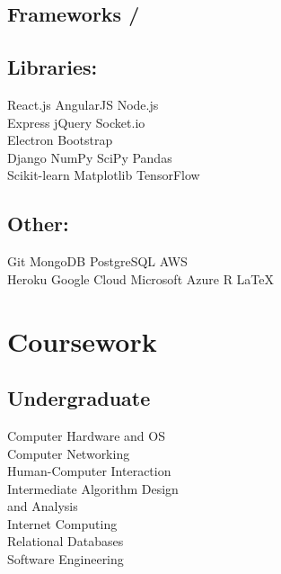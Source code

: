 \documentclass[]{deedy-resume-openfont}
\begin{document}
\begin{minipage}[t]{0.3\textwidth}
\subsection{Frameworks /}
\subsection{Libraries:}
\vspace{1mm}
React.js \textbullet{} AngularJS \textbullet{} Node.js \\
Express \textbullet{} jQuery \textbullet{} Socket.io \\
Electron \textbullet{} Bootstrap \\
\vspace{1mm}
Django \textbullet{} NumPy \textbullet{} SciPy \textbullet{} Pandas \\
Scikit-learn \textbullet{} Matplotlib \textbullet{} TensorFlow \\
\vspace{2mm}
\subsection{Other:}
Git \textbullet{} MongoDB \textbullet{} PostgreSQL \textbullet{} AWS \\
Heroku \textbullet{} Google Cloud \textbullet{} Microsoft Azure \textbullet{} 
R \textbullet{} \LaTeX\ \\


\section{Coursework}
\subsection{Undergraduate}
Computer Hardware and OS \\
Computer Networking \\
Human-Computer Interaction \\
Intermediate Algorithm Design \\
\hspace{2mm}and Analysis \\
Internet Computing \\
Relational Databases \\
Software Engineering \\


\end{minipage}
\end{document}
